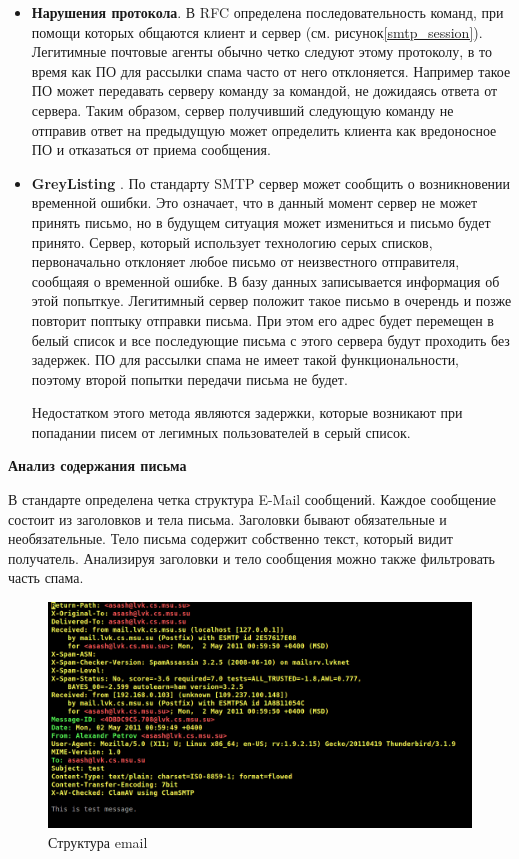 \begin{itemize}
	\item \textbf{Нарушения протокола}. В RFC\cite{RFC2081} определена последовательность команд, при помощи которых общаются клиент и сервер (см. рисунок\ref{smtp_session}). Легитимные почтовые агенты обычно четко следуют этому протоколу, в то время как ПО для рассылки спама часто от него отклоняется. Например такое ПО может передавать серверу команду за командой, не дожидаясь ответа от сервера. Таким образом, сервер получивший следующую команду не отправив ответ на предыдущую  может определить клиента как вредоносное ПО и отказаться от приема сообщения.
	\item \textbf{GreyListing} \cite{GREYLISTING}. По стандарту SMTP \cite{RFC2081} сервер может сообщить о возникновении временной ошибки. Это означает, что в данный момент сервер не может принять письмо, но в будущем ситуация может измениться и письмо будет принято. Сервер, который использует технологию серых списков, первоначально отклоняет любое письмо от неизвестного отправителя, сообщаяя о временной ошибке. В базу данных записывается информация об этой попыткуе. Легитимный сервер положит такое письмо в очерендь и позже повторит поптыку отправки письма. При этом его адрес будет перемещен в белый список и все последующие письма с этого сервера будут проходить без задержек. ПО для рассылки спама не имеет такой функциональности, поэтому второй попытки передачи письма не будет.
	
Недостатком этого метода являются задержки, которые возникают при попадании писем от легимных пользователей в серый список.
\end{itemize}

\textbf{Анализ содержания письма}

В стандарте\cite{RFC2822} определена четка структура E-Mail сообщений. Каждое сообщение состоит из заголовков и тела письма. Заголовки бывают обязательные и необязательные. Тело письма содержит собственно текст, который видит получатель. Анализируя заголовки и тело сообщения можно также фильтровать часть спама.

\begin{figure}[h]
\begin{center}
\includegraphics[width=14cm]{img/simple_email}
\end{center}
\caption{Структура email}
\label{simple_email}
\end{figure}

